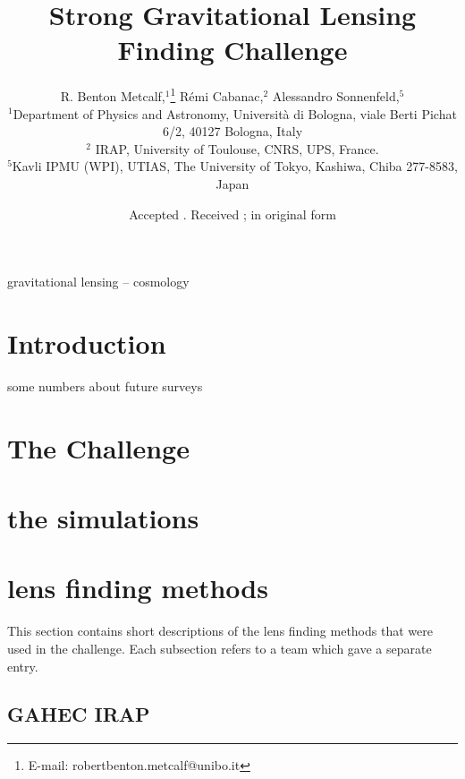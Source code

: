 \documentclass[useAMS,usenatbib]{mn2e}
\title[SL Challenge]{Strong Gravitational  Lensing Finding Challenge}
\author[R. B. Metcalf {\it et al.}]{
R. Benton Metcalf,$^{1}$\thanks{E-mail: robertbenton.metcalf@unibo.it} R\'emi Cabanac,$^2$ 
Alessandro Sonnenfeld,$^5$ \\
$^{1}$Department of Physics and Astronomy, Universit\`a di Bologna, viale Berti Pichat 6/2, 40127 Bologna, Italy \\
$^{2}$ IRAP, University of Toulouse, CNRS, UPS, France.\\
$^{5}$Kavli IPMU (WPI), UTIAS, The University of Tokyo, Kashiwa, Chiba 277-8583, Japan\\
}
\begin{document}
\date{Accepted . Received ; in original form }

\maketitle

\label{firstpage}

\begin{abstract}

\end{abstract}

\begin{keywords}
gravitational lensing -- cosmology 
\end{keywords}


\section{Introduction}

some numbers about future surveys

\section{The Challenge}

\section{the simulations}

\section{lens finding methods}

This section contains short descriptions of the lens finding methods that were used in 
the challenge.  Each subsection refers to a team which gave a separate entry.

\subsection{GAHEC IRAP}
\end{document}
